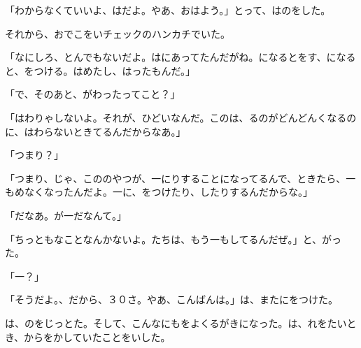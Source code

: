 「わからなくていいよ、はだよ。やあ、おはよう。」とって、はのをした。

それから、おでこをいチェックのハンカチでいた。

「なにしろ、とんでもないだよ。はにあってたんだがね。になるとをす、になると、をつける。はめたし、はったもんだ。」

「で、そのあと、がわったってこと？」

「はわりゃしないよ。それが、ひどいなんだ。このは、るのがどんどんくなるのに、はわらないときてるんだからなあ。」

「つまり？」

「つまり、じゃ、こののやつが、一にりすることになってるんで、ときたら、一もめなくなったんだよ。一に、をつけたり、したりするんだからな。」

「だなあ。が一だなんて。」

「ちっともなことなんかないよ。たちは、もう一もしてるんだぜ。」と、がった。

「一？」

「そうだよ。、だから、３０さ。やあ、こんばんは。」は、またにをつけた。

は、のをじっとた。そして、こんなにもをよくるがきになった。は、れをたいとき、からをかしていたことをいした。

